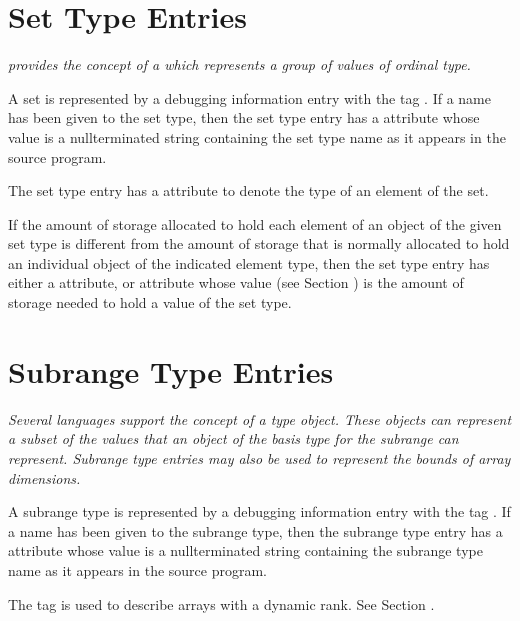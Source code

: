 \section{Set Type Entries}
\label{chap:settypeentries}

\textit{ provides the concept of a  which represents
a group of values of ordinal type.}

A set is represented by a debugging information entry with
the tag \DWTAGsettypeTARG. 
If a name has been given to the
set type, then the set type entry has 
a \DWATname{} attribute
whose value is a null\dash terminated string containing the
set type name as it appears in the source program.

The set type entry has 
a \DWATtype{} attribute to denote the
type of an element of the set.

If the amount of storage allocated to hold each element of an
object of the given set type is different from the amount of
storage that is normally allocated to hold an individual object
of the indicated element type, then the set type entry has
either a \DWATbytesize{} attribute, or 
\DWATbitsize{} attribute
whose value (see Section ) is
the amount of storage needed to hold a value of the set type.


\section{Subrange Type Entries}
\label{chap:subrangetypeentries}

\textit{Several languages support the concept of a 
type object. These objects can represent a subset of the
values that an object of the basis type for the subrange can
represent. 
Subrange type entries may also be used to represent
the bounds of array dimensions.}

A subrange type is represented by a debugging information
entry with the 
tag \DWTAGsubrangetypeTARG. 
If a name has been
given to the subrange type, then the subrange type entry
has a \DWATname{} attribute
whose value is a null\dash terminated
string containing the subrange type name as it appears in
the source program.

The tag \DWTAGgenericsubrange{} is
used to describe arrays with a dynamic rank. See Section
.

